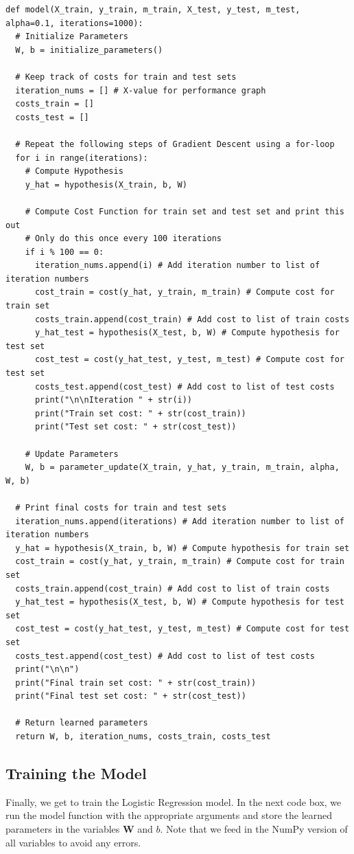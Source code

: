 \documentclass{article}
\begin{document}
\begin{lstlisting}
def model(X_train, y_train, m_train, X_test, y_test, m_test, alpha=0.1, iterations=1000):
  # Initialize Parameters
  W, b = initialize_parameters()

  # Keep track of costs for train and test sets
  iteration_nums = [] # X-value for performance graph
  costs_train = []
  costs_test = []

  # Repeat the following steps of Gradient Descent using a for-loop
  for i in range(iterations):
    # Compute Hypothesis
    y_hat = hypothesis(X_train, b, W)

    # Compute Cost Function for train set and test set and print this out
    # Only do this once every 100 iterations
    if i % 100 == 0:
      iteration_nums.append(i) # Add iteration number to list of iteration numbers
      cost_train = cost(y_hat, y_train, m_train) # Compute cost for train set
      costs_train.append(cost_train) # Add cost to list of train costs
      y_hat_test = hypothesis(X_test, b, W) # Compute hypothesis for test set
      cost_test = cost(y_hat_test, y_test, m_test) # Compute cost for test set
      costs_test.append(cost_test) # Add cost to list of test costs
      print("\n\nIteration " + str(i))
      print("Train set cost: " + str(cost_train))
      print("Test set cost: " + str(cost_test))
    
    # Update Parameters
    W, b = parameter_update(X_train, y_hat, y_train, m_train, alpha, W, b)
  
  # Print final costs for train and test sets
  iteration_nums.append(iterations) # Add iteration number to list of iteration numbers
  y_hat = hypothesis(X_train, b, W) # Compute hypothesis for train set
  cost_train = cost(y_hat, y_train, m_train) # Compute cost for train set
  costs_train.append(cost_train) # Add cost to list of train costs
  y_hat_test = hypothesis(X_test, b, W) # Compute hypothesis for test set
  cost_test = cost(y_hat_test, y_test, m_test) # Compute cost for test set
  costs_test.append(cost_test) # Add cost to list of test costs
  print("\n\n")
  print("Final train set cost: " + str(cost_train))
  print("Final test set cost: " + str(cost_test))

  # Return learned parameters
  return W, b, iteration_nums, costs_train, costs_test
\end{lstlisting}

\subsection{Training the Model}
Finally, we get to train the Logistic Regression model. In the next code box, we run the model function with the appropriate arguments and store the learned parameters in the variables $\textbf{W}$ and $b$. Note that we feed in the NumPy version of all variables to avoid any errors.
\end{document}
